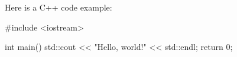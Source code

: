 \documentclass{article}
\begin{document}
Here is a C++ code example:

\begin{cppcode}
#include <iostream>

int main() {
    std::cout << "Hello, world!" << std::endl;
    return 0;
}
\end{cppcode}
\end{document}
